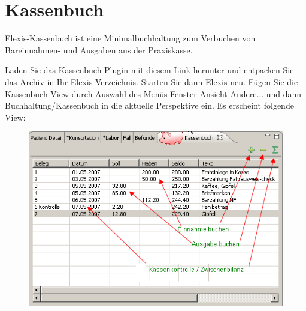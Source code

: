 
\section{Kassenbuch} \label{Kassenbuch}
Elexis-Kassenbuch ist eine Minimalbuchhaltung zum Verbuchen von Bareinnahmen- und Ausgaben aus der Praxiskasse.

 Laden Sie das Kassenbuch-Plugin mit \href{http://www.rgw.ch/download.php?file=elexis-kassenbuch}{diesem Link} herunter und entpacken Sie das Archiv in Ihr Elexis-Verzeichnis. Starten Sie dann Elexis neu.
Fügen Sie die Kassenbuch-View durch Auswahl des Menüs Fenster-Ansicht-Andere... und dann Buchhaltung/Kassenbuch in die aktuelle Perspektive ein. Es erscheint folgende View:
\begin{figure}[htp]
\begin{center}
  \includegraphics{images/kassenbuch}
  \label{fig:kassenbuch}
\end{center}
\end{figure}

